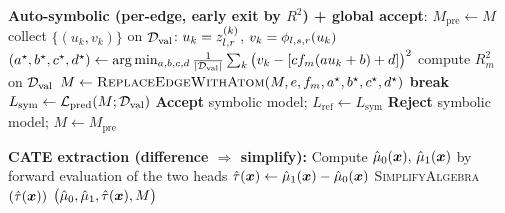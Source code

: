 \begin{algorithm}[t]
\begin{algorithmic}[1]
\State \textbf{Auto-symbolic (per-edge, early exit by $R^2$) + global accept}:
\State $M_{\text{pre}} \gets M$ 
  \State collect $\{(u_k,v_k)\}$ on $\mathcal{D}_{\text{val}}$: $u_k=z_{l,r}^{(k)}$, $v_k=\phi_{l,s,r}(u_k)$
    \State $(a^\star,b^\star,c^\star,d^\star)\gets\arg\min_{a,b,c,d}\tfrac{1}{|\mathcal{D}_{\text{val}}|}\sum_k \big(v_k-[c f_m(a u_k+b)+d]\big)^2$
    \State compute $R^2_m$ on $\mathcal{D}_{\text{val}}$
      \State $M \gets \textsc{ReplaceEdgeWithAtom}(M,e,f_m,a^\star,b^\star,c^\star,d^\star)$ 
      \State \textbf{break}
    \EndIf
  \EndFor
\EndFor
\State $L_{\text{sym}} \gets \mathcal{L}_{\text{pred}}(M;\mathcal{D}_{\text{val}})$
  \State \textbf{Accept} symbolic model; $L_{\text{ref}} \gets L_{\text{sym}}$
\Else
  \State \textbf{Reject} symbolic model; $M \gets M_{\text{pre}}$
\EndIf
\Statex

\State \textbf{CATE extraction (difference $\Rightarrow$ simplify):}
\State Compute $\hat{\mu}_0({\bm{x}}),\,\hat{\mu}_1({\bm{x}})$ by forward evaluation of the two heads
\State $\hat{\tau}({\bm{x}}) \gets \hat{\mu}_1({\bm{x}})-\hat{\mu}_0({\bm{x}})$
\State \textsc{SimplifyAlgebra}$(\hat{\tau}({\bm{x}}))$ 
\State \Return $\big(\hat{\mu}_0,\hat{\mu}_1,\hat{\tau}({\bm{x}}), M\big)$
\end{algorithmic}
\end{algorithm}


